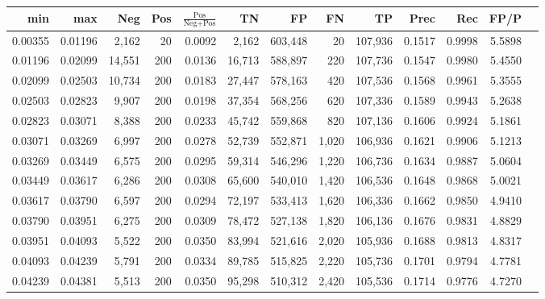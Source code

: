 \begin{tabular}{rrrrrrrrrrrrr}
\toprule
    min &     max &    Neg & Pos & $\frac{\text{Pos}}{\text{Neg}+\text{Pos}}$ &      TN &      FP &      FN &      TP &   Prec &    Rec &   FP/P \\
\midrule
0.00355 & 0.01196 &  2,162 &  20 &                                     0.0092 &   2,162 & 603,448 &      20 & 107,936 & 0.1517 & 0.9998 & 5.5898 \\
0.01196 & 0.02099 & 14,551 & 200 &                                     0.0136 &  16,713 & 588,897 &     220 & 107,736 & 0.1547 & 0.9980 & 5.4550 \\
0.02099 & 0.02503 & 10,734 & 200 &                                     0.0183 &  27,447 & 578,163 &     420 & 107,536 & 0.1568 & 0.9961 & 5.3555 \\
0.02503 & 0.02823 &  9,907 & 200 &                                     0.0198 &  37,354 & 568,256 &     620 & 107,336 & 0.1589 & 0.9943 & 5.2638 \\
0.02823 & 0.03071 &  8,388 & 200 &                                     0.0233 &  45,742 & 559,868 &     820 & 107,136 & 0.1606 & 0.9924 & 5.1861 \\
0.03071 & 0.03269 &  6,997 & 200 &                                     0.0278 &  52,739 & 552,871 &   1,020 & 106,936 & 0.1621 & 0.9906 & 5.1213 \\
0.03269 & 0.03449 &  6,575 & 200 &                                     0.0295 &  59,314 & 546,296 &   1,220 & 106,736 & 0.1634 & 0.9887 & 5.0604 \\
0.03449 & 0.03617 &  6,286 & 200 &                                     0.0308 &  65,600 & 540,010 &   1,420 & 106,536 & 0.1648 & 0.9868 & 5.0021 \\
0.03617 & 0.03790 &  6,597 & 200 &                                     0.0294 &  72,197 & 533,413 &   1,620 & 106,336 & 0.1662 & 0.9850 & 4.9410 \\
0.03790 & 0.03951 &  6,275 & 200 &                                     0.0309 &  78,472 & 527,138 &   1,820 & 106,136 & 0.1676 & 0.9831 & 4.8829 \\
0.03951 & 0.04093 &  5,522 & 200 &                                     0.0350 &  83,994 & 521,616 &   2,020 & 105,936 & 0.1688 & 0.9813 & 4.8317 \\
0.04093 & 0.04239 &  5,791 & 200 &                                     0.0334 &  89,785 & 515,825 &   2,220 & 105,736 & 0.1701 & 0.9794 & 4.7781 \\
0.04239 & 0.04381 &  5,513 & 200 &                                     0.0350 &  95,298 & 510,312 &   2,420 & 105,536 & 0.1714 & 0.9776 & 4.7270 \\

\end{tabular}
